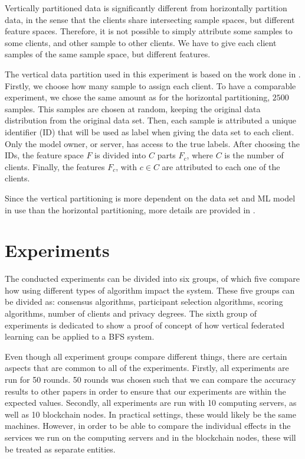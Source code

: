 Vertically partitioned data is significantly different from horizontally partition data, in the sense that the clients share intersecting sample spaces, but different feature spaces. Therefore, it is not possible to simply attribute some samples to some clients, and other sample to other clients. We have to give each client samples of the same sample space, but different features.

The vertical data partition used in this experiment is based on the work done in \cite{10.48550/arxiv.2104.00489}. Firstly, we choose how many sample to assign each client. To have a comparable experiment, we chose the same amount as for the horizontal partitioning, $2500$ samples. This samples are chosen at random, keeping the original data distribution from the original data set. Then, each sample is attributed a unique identifier (ID) that will be used as label when giving the data set to each client. Only the model owner, or server, has access to the true labels. After choosing the IDs, the feature space $F$ is divided into $C$ parts $F_c$, where $C$ is the number of clients. Finally, the features $F_c$, with $c \in C$ are attributed to each one of the clients.

Since the vertical partitioning is more dependent on the data set and ML model in use than the horizontal partitioning, more details are provided in .

\section{Experiments}\label{meth:experiments}

The conducted experiments can be divided into six groups, of which five compare how using different types of algorithm impact the system. These five groups can be divided as: consensus algorithms, participant selection algorithms, scoring algorithms, number of clients and privacy degrees. The sixth group of experiments is dedicated to show a proof of concept of how vertical federated learning can be applied to a BFS system.

Even though all experiment groups compare different things, there are certain aspects that are common to all of the experiments. Firstly, all experiments are run for 50 rounds. 50 rounds was chosen such that we can compare the accuracy results to other papers in order to ensure that our experiments are within the expected values. Secondly, all experiments are run with 10 computing servers, as well as 10 blockchain nodes. In practical settings, these would likely be the same machines. However, in order to be able to compare the individual effects in the services we run on the computing servers and in the blockchain nodes, these will be treated as separate entities.

